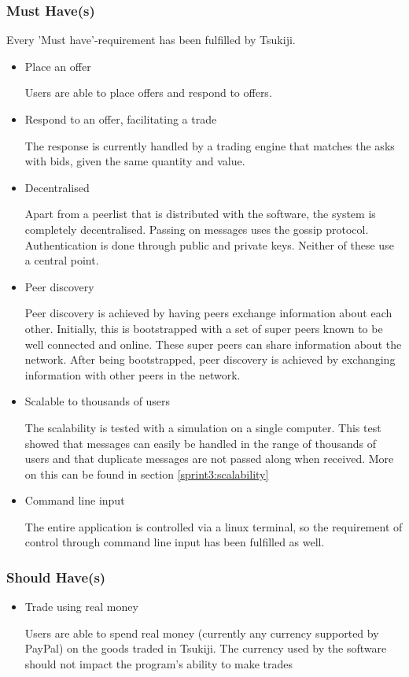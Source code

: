 \subsubsection{Must Have(s)}
Every 'Must have'-requirement has been fulfilled by Tsukiji.

\begin{itemize}
\item Place an offer

Users are able to place offers and respond to offers.

\item Respond to an offer, facilitating a trade

The response is currently handled by a trading engine that matches the asks with bids, given the same quantity and value.

\item Decentralised

Apart from a peerlist that is distributed with the software, the system is completely decentralised.
Passing on messages uses the gossip protocol.
Authentication is done through public and private keys.
Neither of these use a central point.

\item Peer discovery 

Peer discovery is achieved by having peers exchange information about each other.
Initially, this is bootstrapped with a set of super peers known to be well connected and online.
These super peers can share information about the network.
After being bootstrapped, peer discovery is achieved by exchanging information with other peers in the network.

\item Scalable to thousands of users

The scalability is tested with a simulation on a single computer.
This test showed that messages can easily be handled in the range of thousands of users and that duplicate messages are not passed along when received.
More on this can be found in section \ref{sprint3:scalability}

\item Command line input

The entire application is controlled via a linux terminal, so the requirement of control through command line input has been fulfilled as well.
\end{itemize}

\subsubsection{Should Have(s)}
\begin{itemize}
\item Trade using real money

Users are able to spend real money (currently any currency supported by PayPal) on the goods traded in Tsukiji.
The currency used by the software should not impact the program's ability to make trades
\end{itemize}

